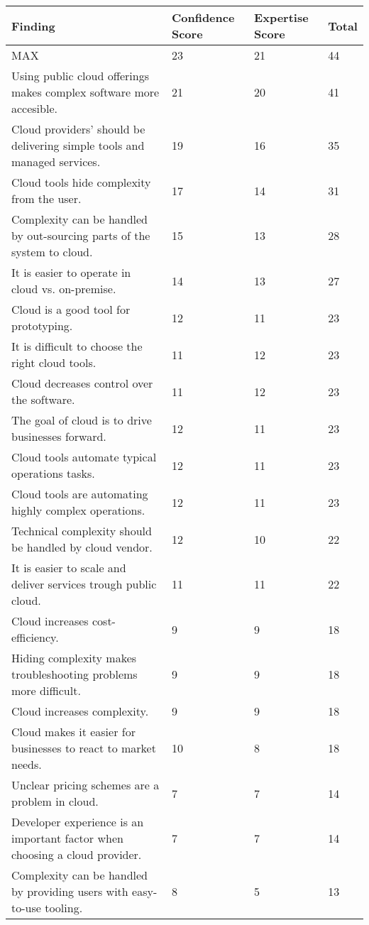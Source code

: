 
\renewcommand\arraystretch{1.5}%
\begin{longtable}{|p{10cm}|p{2cm}|p{2cm}|}
\hline
\textbf{Finding}  & \textbf{Confidence Score} & \textbf{Expertise Score} & \textbf{Total} \\ \hline
\endhead
MAX & 23 & 21 & 44 \\ \hline
Using public cloud offerings makes complex software more accesible. & 21 & 20 & 41 \\ \hline
Cloud providers' should be delivering simple tools and managed services. & 19 & 16 & 35 \\ \hline
Cloud tools hide complexity from the user. & 17 & 14 & 31 \\ \hline
Complexity can be handled by out-sourcing parts of the system to cloud. & 15 & 13 & 28 \\ \hline
It is easier to operate in cloud vs. on-premise. & 14 & 13 & 27 \\ \hline
Cloud is a good tool for prototyping. & 12 & 11 & 23 \\ \hline
It is difficult to choose the right cloud tools. & 11 & 12 & 23 \\ \hline
Cloud decreases control over the software. & 11 & 12 & 23 \\ \hline
The goal of cloud is to drive businesses forward. & 12 & 11 & 23 \\ \hline
Cloud tools automate typical operations tasks. & 12 & 11 & 23 \\ \hline
Cloud tools are automating highly complex operations. & 12 & 11 & 23 \\ \hline
Technical complexity should be handled by cloud vendor. & 12 & 10 & 22 \\ \hline
It is easier to scale and deliver services trough public cloud. & 11 & 11 & 22 \\ \hline
Cloud increases cost-efficiency. & 9 & 9 & 18 \\ \hline
Hiding complexity makes troubleshooting problems more difficult. & 9 & 9 & 18 \\ \hline
Cloud increases complexity. & 9 & 9 & 18 \\ \hline
Cloud makes it easier for businesses to react to market needs. & 10 & 8 & 18 \\ \hline
Unclear pricing schemes are a problem in cloud. & 7 & 7 & 14 \\ \hline
Developer experience is an important factor when choosing a cloud provider. & 7 & 7 & 14 \\ \hline
Complexity can be handled by providing users with easy-to-use tooling. & 8 & 5 & 13 \\ \hline

\end{longtable}

